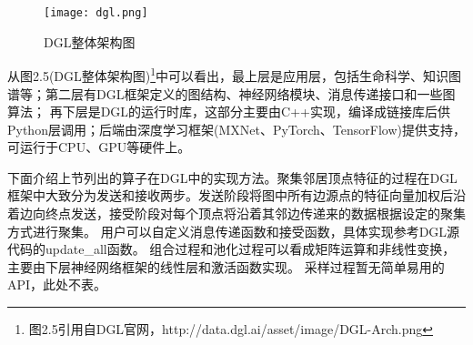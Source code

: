\begin{figure}[htb]
    \centering
    \texttt{[image: dgl.png]}
    \caption{DGL整体架构图}
\end{figure}

从图2.5(DGL整体架构图)\footnote{图2.5引用自DGL官网，http://data.dgl.ai/asset/image/DGL-Arch.png}中可以看出，最上层是应用层，包括生命科学、知识图谱等；第二层有DGL框架定义的图结构、神经网络模块、消息传递接口和一些图算法；
再下层是DGL的运行时库，这部分主要由C++实现，编译成链接库后供Python层调用；后端由深度学习框架(MXNet、PyTorch、TensorFlow)提供支持，可运行于CPU、GPU等硬件上。

下面介绍上节列出的算子在DGL中的实现方法。聚集邻居顶点特征的过程在DGL框架中大致分为发送和接收两步。发送阶段将图中所有边源点的特征向量加权后沿着边向终点发送，接受阶段对每个顶点将沿着其邻边传递来的数据根据设定的聚集方式进行聚集。
用户可以自定义消息传递函数和接受函数，具体实现参考DGL源代码的update\_all函数。
组合过程和池化过程可以看成矩阵运算和非线性变换，主要由下层神经网络框架的线性层和激活函数实现。
采样过程暂无简单易用的API，此处不表。